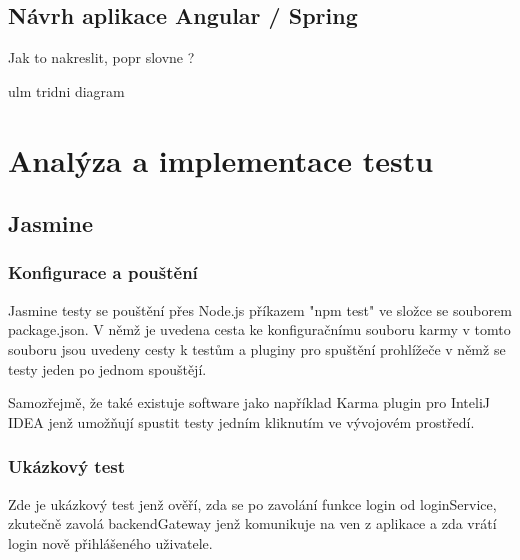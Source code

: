 \documentclass[czech,master,public,dept460,male,cpdeclaration,twoside]{diploma}
\begin{document}
\subsection{Návrh aplikace Angular / Spring}
Jak to nakreslit, popr slovne ?

ulm tridni diagram

\section{Analýza a implementace testu}

\subsection{Jasmine}
\subsubsection{Konfigurace a pouštění}
Jasmine testy se pouštění přes Node.js příkazem "npm test" ve složce se souborem package.json. V němž je uvedena cesta ke konfiguračnímu souboru karmy v tomto souboru jsou uvedeny cesty k testům a pluginy pro spuštění prohlížeče v němž se testy jeden po jednom spouštějí. 

Samozřejmě, že také existuje software jako například Karma plugin pro InteliJ IDEA jenž umožňují spustit testy jedním kliknutím ve vývojovém prostředí.

\subsubsection{Ukázkový test}
Zde je ukázkový test jenž ověří, zda se po zavolání funkce login od loginService, zkutečně zavolá backendGateway jenž komunikuje na ven z aplikace a zda vrátí login nově přihlášeného uživatele.
  
\end{document}
